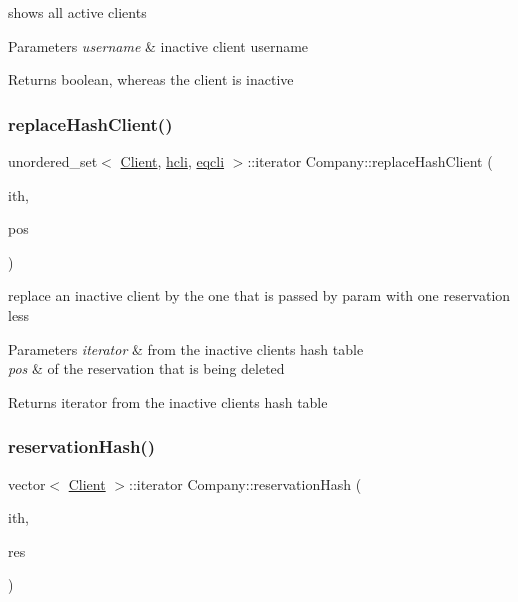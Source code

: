 shows all active clients 


\begin{DoxyParams}{Parameters}
{\em username} & inactive client username\\
\hline
\end{DoxyParams}
\begin{DoxyReturn}{Returns}
boolean, whereas the client is inactive 
\end{DoxyReturn}
\hypertarget{class_company_a19b18b69d4ebffc02ca415c8256f7696}{}\label{class_company_a19b18b69d4ebffc02ca415c8256f7696} 
\subsubsection{\texorpdfstring{replace\+Hash\+Client()}{replaceHashClient()}}
{\footnotesize\ttfamily unordered\+\_\+set$<$ \hyperlink{class_client}{Client}, \hyperlink{structhcli}{hcli}, \hyperlink{structeqcli}{eqcli} $>$\+::iterator Company\+::replace\+Hash\+Client (\begin{DoxyParamCaption}\item[{unordered\+\_\+set$<$ \hyperlink{class_client}{Client}, \hyperlink{structhcli}{hcli}, \hyperlink{structeqcli}{eqcli} $>$\+::iterator}]{ith,  }\item[{int}]{pos }\end{DoxyParamCaption})}



replace an inactive client by the one that is passed by param with one reservation less 


\begin{DoxyParams}{Parameters}
{\em iterator} & from the inactive clients hash table\\
\hline
{\em pos} & of the reservation that is being deleted\\
\hline
\end{DoxyParams}
\begin{DoxyReturn}{Returns}
iterator from the inactive clients hash table 
\end{DoxyReturn}
\hypertarget{class_company_ab94adc44faec0f3975c9b7bf7b7e3c56}{}\label{class_company_ab94adc44faec0f3975c9b7bf7b7e3c56} 
\subsubsection{\texorpdfstring{reservation\+Hash()}{reservationHash()}}
{\footnotesize\ttfamily vector$<$ \hyperlink{class_client}{Client} $>$\+::iterator Company\+::reservation\+Hash (\begin{DoxyParamCaption}\item[{unordered\+\_\+set$<$ \hyperlink{class_client}{Client}, \hyperlink{structhcli}{hcli}, \hyperlink{structeqcli}{eqcli} $>$\+::iterator}]{ith,  }\item[{\hyperlink{class_reservation}{Reservation}}]{res }\end{DoxyParamCaption})}



